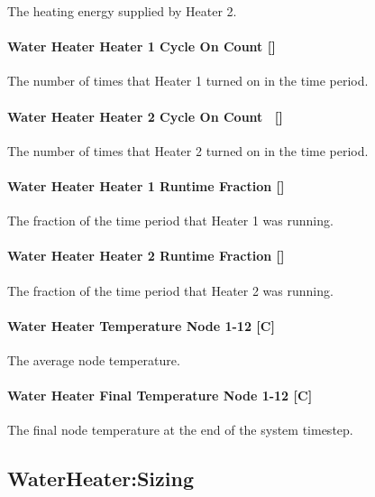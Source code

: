 The heating energy supplied by Heater 2.

\paragraph{Water Heater Heater 1 Cycle On Count {[]}}\label{water-heater-heater-1-cycle-on-count}

The number of times that Heater 1 turned on in the time period.

\paragraph{Water Heater Heater 2 Cycle On Count~ {[]}}\label{water-heater-heater-2-cycle-on-count}

The number of times that Heater 2 turned on in the time period.

\paragraph{Water Heater Heater 1 Runtime Fraction {[]}}\label{water-heater-heater-1-runtime-fraction}

The fraction of the time period that Heater 1 was running.

\paragraph{Water Heater Heater 2 Runtime Fraction {[]}}\label{water-heater-heater-2-runtime-fraction}

The fraction of the time period that Heater 2 was running.

\paragraph{Water Heater Temperature Node 1-12 {[}C{]}}\label{water-heater-temperature-node-1-12-c}

The average node temperature.

\paragraph{Water Heater Final Temperature Node 1-12 {[}C{]}}\label{water-heater-final-temperature-node-1-12-c}

The final node temperature at the end of the system timestep.

\subsection{WaterHeater:Sizing}\label{waterheatersizing}

